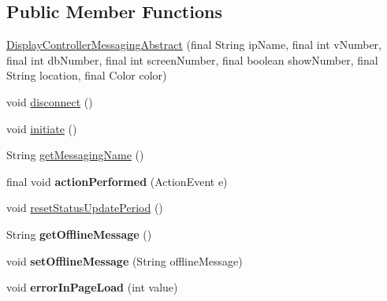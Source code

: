 \subsection*{Public Member Functions}
\begin{DoxyCompactItemize}
\item 
\hyperlink{classgov_1_1fnal_1_1ppd_1_1dd_1_1display_1_1client_1_1DisplayControllerMessagingAbstract_a29d30efd5c44b5ac8ad2044fc8e9209e}{Display\-Controller\-Messaging\-Abstract} (final String ip\-Name, final int v\-Number, final int db\-Number, final int screen\-Number, final boolean show\-Number, final String location, final Color color)
\item 
void \hyperlink{classgov_1_1fnal_1_1ppd_1_1dd_1_1display_1_1client_1_1DisplayControllerMessagingAbstract_ab4669eeb7e29918c88f15ea2afc17604}{disconnect} ()
\item 
void \hyperlink{classgov_1_1fnal_1_1ppd_1_1dd_1_1display_1_1client_1_1DisplayControllerMessagingAbstract_ae25c8ff7cfa18c137ff9b0a04f65fd8c}{initiate} ()
\item 
String \hyperlink{classgov_1_1fnal_1_1ppd_1_1dd_1_1display_1_1client_1_1DisplayControllerMessagingAbstract_a7d2a03dd8cfa663368cbcf67fbcf804e}{get\-Messaging\-Name} ()
\item 
\hypertarget{classgov_1_1fnal_1_1ppd_1_1dd_1_1display_1_1client_1_1DisplayControllerMessagingAbstract_a669e9d8cd86408c7b578c7b5c39650b7}{final void {\bfseries action\-Performed} (Action\-Event e)}\label{classgov_1_1fnal_1_1ppd_1_1dd_1_1display_1_1client_1_1DisplayControllerMessagingAbstract_a669e9d8cd86408c7b578c7b5c39650b7}

\item 
void \hyperlink{classgov_1_1fnal_1_1ppd_1_1dd_1_1display_1_1client_1_1DisplayControllerMessagingAbstract_a250a11334b2f2a724775f02a37065e5b}{reset\-Status\-Update\-Period} ()
\item 
\hypertarget{classgov_1_1fnal_1_1ppd_1_1dd_1_1display_1_1client_1_1DisplayControllerMessagingAbstract_a02fcbfd5923cccc17585007ceb7cc558}{String {\bfseries get\-Offline\-Message} ()}\label{classgov_1_1fnal_1_1ppd_1_1dd_1_1display_1_1client_1_1DisplayControllerMessagingAbstract_a02fcbfd5923cccc17585007ceb7cc558}

\item 
\hypertarget{classgov_1_1fnal_1_1ppd_1_1dd_1_1display_1_1client_1_1DisplayControllerMessagingAbstract_ac134aed7d435082990e7ede49f5a641c}{void {\bfseries set\-Offline\-Message} (String offline\-Message)}\label{classgov_1_1fnal_1_1ppd_1_1dd_1_1display_1_1client_1_1DisplayControllerMessagingAbstract_ac134aed7d435082990e7ede49f5a641c}

\item 
\hypertarget{classgov_1_1fnal_1_1ppd_1_1dd_1_1display_1_1client_1_1DisplayControllerMessagingAbstract_a3d9858154eb1bf65755cf3eab56539ad}{void {\bfseries error\-In\-Page\-Load} (int value)}\label{classgov_1_1fnal_1_1ppd_1_1dd_1_1display_1_1client_1_1DisplayControllerMessagingAbstract_a3d9858154eb1bf65755cf3eab56539ad}

\end{DoxyCompactItemize}
